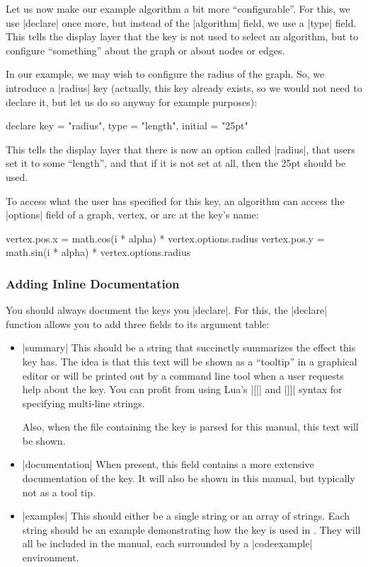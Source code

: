 Let us now make our example algorithm a bit more ``configurable''. For
this, we use |declare| once more, but instead of the |algorithm|
field, we use a |type| field. This tells the display layer that the
key is not used to select an algorithm, but to configure ``something''
about the graph or about nodes or edges.

In our example, we may wish to configure the radius of the graph. So,
we introduce a |radius| key (actually, this key already exists, so we
would not need to declare it, but let us do so anyway for example
purposes):

\begin{codeexample}[code only, tikz syntax=false]
declare {
  key = "radius",
  type = "length",
  initial = "25pt"
}
\end{codeexample}

This tells the display layer that there is now an option called
|radius|, that users set it to some ``length'', and that if it is not
set at all, then the 25pt should be used.

To access what the user has specified for this key, an algorithm can
access the |options| field of a graph, vertex, or arc at the
key's name:

\begin{codeexample}[code only, tikz syntax=false]
          vertex.pos.x = math.cos(i * alpha) * vertex.options.radius
          vertex.pos.y = math.sin(i * alpha) * vertex.options.radius
\end{codeexample}



\subsubsection{Adding Inline Documentation}

You should always document the keys you |declare|. For this, the
|declare| function allows you to add three fields to its argument
table:
\begin{itemize}
\item |summary| This should be a string that succinctly summarizes the
  effect this key has. The idea is that this text will be shown as a
  ``tooltip'' in a graphical editor or will be printed out by a
  command line tool when a user requests help about the key.
  You can profit from using Lua's |[[| and |]]| syntax for specifying
  multi-line strings.
  
  Also, when the file containing the key is parsed for
  this manual, this text will be shown.
\item |documentation| When present, this field contains a more
  extensive documentation of the key. It will also be shown in this
  manual, but typically not as a tool tip.
\item |examples| This should either be a single string or an array of
  strings. Each string should be an example demonstrating how the key
  is used in \tikzname. They will all be included in the manual, each
  surrounded by a |codeexample| environment.
\end{itemize}

